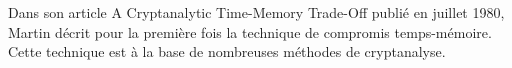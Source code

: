 
	Dans son article \og{}A Cryptanalytic Time-Memory Trade-Off\fg{}\cite{ehellman} publié en juillet 1980, Martin  décrit pour la première fois la technique de compromis temps-mémoire. Cette technique est à la base de nombreuses méthodes de cryptanalyse.

	

\endinput{}
